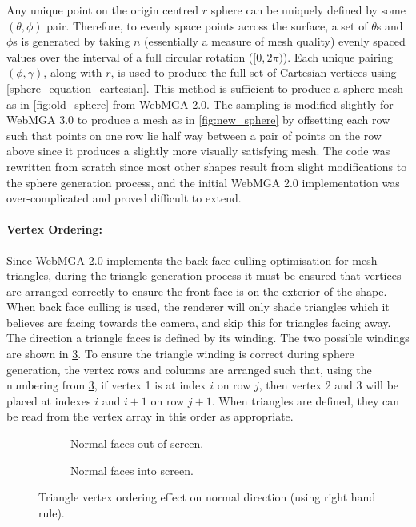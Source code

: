 Any unique point on the origin centred $r$ sphere can be uniquely defined by some $(\theta,\phi)$ pair. Therefore, to evenly space points across the surface, a set of $\theta$s and $\phi$s is generated by taking $n$ (essentially a measure of mesh quality) evenly spaced values over the interval of a full circular rotation ($[0, 2\pi)$). Each unique pairing $(\phi,\gamma)$, along with $r$, is used to produce the full set of Cartesian vertices using \cref{sphere_equation_cartesian}. This method is sufficient to produce a sphere mesh as in \cref{fig:old_sphere} from WebMGA 2.0. The sampling is modified slightly for WebMGA 3.0 to produce a mesh as in \cref{fig:new_sphere} by offsetting each row such that points on one row lie half way between a pair of points on the row above since it produces a slightly more visually satisfying mesh. The code was rewritten from scratch since most other shapes result from slight modifications to the sphere generation process, and the initial WebMGA 2.0 implementation was over-complicated and proved difficult to extend.

\paragraph{Vertex Ordering:} Since WebMGA 2.0 implements the back face culling optimisation\cite{face_cull} for mesh triangles, during the triangle generation process it must be ensured that vertices are arranged correctly to ensure the front face is on the exterior of the shape. When back face culling is used, the renderer will only shade triangles which it believes are facing towards the camera, and skip this for triangles facing away. The direction a triangle faces is defined by its winding. The two possible windings are shown in \cref{fig:triangle}. To ensure the triangle winding is correct during sphere generation, the vertex rows and columns are arranged such that, using the numbering from \cref{fig:triangle}, if vertex 1 is at index $i$ on row $j$, then vertex 2 and 3 will be placed at indexes $i$ and $i+1$ on row $j+1$. When triangles are defined, they can be read from the vertex array in this order as appropriate.

\begin{figure}
  \begin{center}
    \begin{subfigure}{0.4\textwidth}
      
      \caption{Normal faces out of screen.}
      \label{fig:out_normal}
    \end{subfigure}
        \begin{subfigure}{0.4\textwidth}
      
      \caption{Normal faces into screen.}
      \label{fig:in_normal}
    \end{subfigure}
  \end{center}
  \caption{Triangle vertex ordering effect on normal direction (using right hand rule).}
  \label{fig:triangle}
\end{figure}

